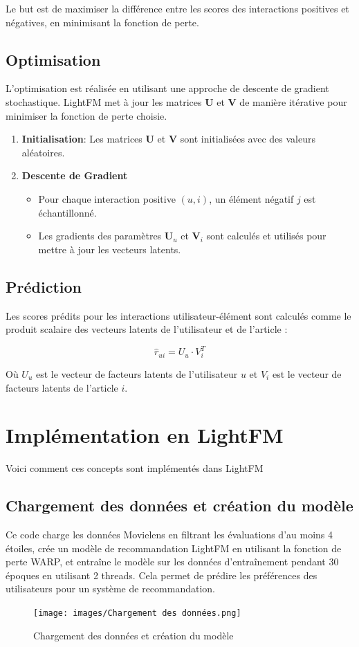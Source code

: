 \documentclass[edit,12pt,a4paper,ChapStyle,oneside,doubleinterligne]{report}
\begin{document}
Le but est de maximiser la différence entre les scores des interactions positives et négatives, en minimisant la fonction de perte.
\subsection{Optimisation}
L'optimisation est réalisée en utilisant une approche de descente de gradient stochastique. LightFM met à jour les matrices \( \mathbf{U} \) et \( \mathbf{V} \) de manière itérative pour minimiser la fonction de perte choisie.

\begin{enumerate}
    \item \textbf{Initialisation}: Les matrices \( \mathbf{U} \) et \( \mathbf{V} \) sont initialisées avec des valeurs aléatoires.
    \item \textbf{Descente de Gradient}
    \begin{itemize}
        \item Pour chaque interaction positive \( (u, i) \), un élément négatif \( j \) est échantillonné.
        \item Les gradients des paramètres \( \mathbf{U}_u \) et \( \mathbf{V}_i \) sont calculés et utilisés pour mettre à jour les vecteurs latents.
    \end{itemize}
\end{enumerate}
\subsection{Prédiction}
Les scores prédits pour les interactions utilisateur-élément sont calculés comme le produit scalaire des vecteurs latents de l'utilisateur et de l'article : 

\[
\hat{r}_{ui} = U_u \cdot V_i^T
\]

Où \(U_u\) est le vecteur de facteurs latents de l'utilisateur \(u\) et \(V_i\) est le vecteur de facteurs latents de l'article \(i\).

\section{Implémentation en LightFM}
Voici comment ces concepts sont implémentés dans LightFM
\subsection{Chargement des données et création du modèle}
Ce code charge les données Movielens en filtrant les évaluations d'au moins 4 étoiles, crée un modèle de recommandation LightFM en utilisant la fonction de perte WARP, et entraîne le modèle sur les données d'entraînement pendant 30 époques en utilisant 2 threads. Cela permet de prédire les préférences des utilisateurs pour un système de recommandation.
\begin{figure} [H]
    \centering
    \texttt{[image: images/Chargement des données.png]}
    \caption{Chargement des données et création du modèle}
    \label{fig: cdd}
\end{figure}
\end{document}
